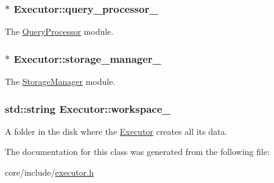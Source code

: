 \subsubsection[{query\+\_\+processor\+\_\+}]{$\ast$ Executor\+::query\+\_\+processor\+\_\+\hspace{0.3cm}{\ttfamily [private]}}\label{classExecutor_a83f7004773177d4dd47ca0a3f32d4f89}
The \hyperlink{classQueryProcessor}{Query\+Processor} module. \hypertarget{classExecutor_ae8cbe36555c96a8d5efde76a542acd92}{}
\subsubsection[{storage\+\_\+manager\+\_\+}]{$\ast$ Executor\+::storage\+\_\+manager\+\_\+\hspace{0.3cm}{\ttfamily [private]}}\label{classExecutor_ae8cbe36555c96a8d5efde76a542acd92}
The \hyperlink{classStorageManager}{Storage\+Manager} module. \hypertarget{classExecutor_a6acb7687ad0865b90cb77f3290482d8b}{}
\subsubsection[{workspace\+\_\+}]{\setlength{\rightskip}{0pt plus 5cm}std\+::string Executor\+::workspace\+\_\+\hspace{0.3cm}{\ttfamily [private]}}\label{classExecutor_a6acb7687ad0865b90cb77f3290482d8b}
A folder in the disk where the \hyperlink{classExecutor}{Executor} creates all its data. 

The documentation for this class was generated from the following file\+:\begin{DoxyCompactItemize}
\item 
core/include/\hyperlink{executor_8h}{executor.\+h}\end{DoxyCompactItemize}
